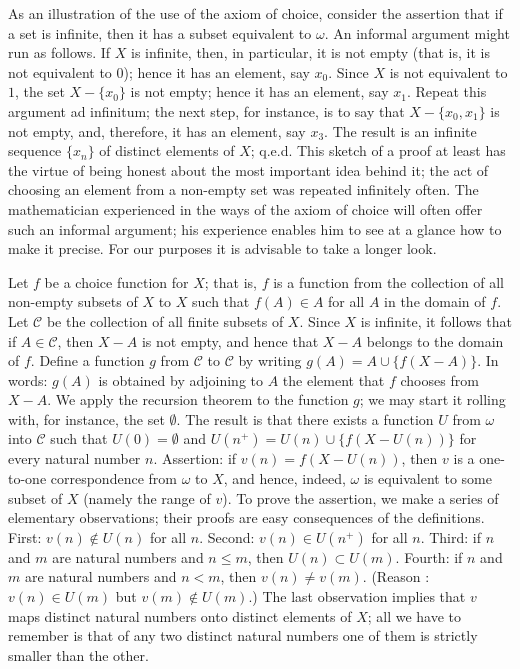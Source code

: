 As an illustration of the use of the axiom of choice, consider the assertion that if a set is infinite, then it has a subset equivalent to $\omega$. An informal argument might run as follows. If $X$ is infinite, then, in particular, it is not empty (that is, it is not equivalent to $0$); hence it has an element, say $x_{0}$. Since $X$ is not equivalent to $1$, the set $X - \{ x_{0} \}$ is not empty; hence it has an element, say $x_{1}$. Repeat this argument ad infinitum; the next step, for instance, is to say that $X - \{ x_{0}, x_{1} \}$ is not empty, and, therefore, it has an element, say $x_{3}$. The result is an infinite sequence $\{ x_{n} \}$ of distinct elements of $X$; q.e.d. This sketch of a proof at least has the virtue of being honest about the most important idea behind it; the act of choosing an element from a non-empty set was repeated infinitely often. The mathematician experienced in the ways of the axiom of choice will often offer such an informal argument; his experience enables him to see at a glance how to make it precise. For our purposes it is advisable to take a longer look.

Let $f$ be a choice function for $X$; that is, $f$ is a function from the collection of all non-empty subsets of $X$ to $X$ such that $f(A) \in A$ for all $A$ in the domain of $f$. Let $\mathcal{C}$ be the collection of all finite subsets of $X$. Since $X$ is infinite, it follows that if $A \in \mathcal{C}$, then $X - A$ is not empty, and hence that $X - A$ belongs to the domain of $f$. Define a function $g$ from $\mathcal{C}$ to $\mathcal{C}$ by writing $g(A) = A \cup \{ f(X - A) \}$. In words: $g(A)$ is obtained by adjoining to $A$ the element that $f$ chooses from $X - A$. We apply the recursion theorem to the function $g$; we may start it rolling with, for instance, the set $ \emptyset $. The result is that there exists a function $U$ from $\omega$ into $\mathcal{C}$ such that $U(0) = \emptyset$ and $U(n^{+}) = U(n) \cup \{ f(X - U(n)) \}$ for every natural number $n$. Assertion: if $v(n) = f(X - U(n))$, then $v$ is a one-to-one correspondence from $\omega$ to $X$, and hence, indeed, $\omega$ is equivalent to some subset of $X$ (namely the range of $v$). To prove the assertion, we make a series  of  elementary observations; their proofs are easy consequences of the definitions. First: $v(n) \notin U(n)$ for all $n$. Second: $v(n) \in U(n^{+})$ for all $n$. Third: if $n$ and $m$ are natural numbers and $n \le m$, then $U(n) \subset U(m)$. Fourth: if $n$ and $m$ are natural numbers and $n < m$, then $v(n) \neq v(m)$.  (Reason : $v(n) \in U(m)$ but $v(m) \notin U(m)$.) The last observation implies that $v$ maps distinct natural numbers onto distinct elements of $X$; all we have to remember is that of any two distinct natural numbers one of them is strictly smaller than the other. 

